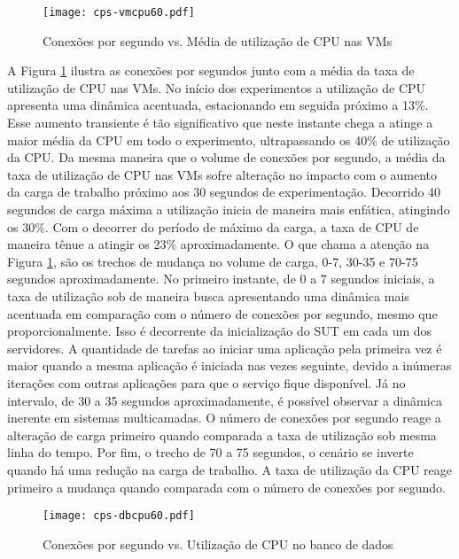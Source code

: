 \begin{figure}[htb]
	\centering
	\texttt{[image: cps-vmcpu60.pdf]}
	\caption{Conexões por segundo vs. Média de utilização de CPU nas VMs}
	\label{fig:cps-vmcpu60}
	\fdadospesquisa
\end{figure}

A Figura \ref{fig:cps-vmcpu60} ilustra as conexões por segundos junto com a média da taxa de utilização de CPU nas VMs. No início dos experimentos a utilização de CPU apresenta uma dinâmica acentuada, estacionando em seguida próximo a 13\%. Esse aumento transiente é tão significativo que neste instante chega a atinge a maior média da CPU em todo o experimento, ultrapassando os 40\% de utilização da CPU. Da mesma maneira que o volume de conexões por segundo, a média da taxa de utilização de CPU nas VMs sofre alteração no impacto com o aumento da carga de trabalho próximo aos 30 segundos de experimentação. Decorrido 40 segundos de carga máxima a utilização inicia de maneira mais enfática, atingindo os 30\%. Com o decorrer do período de máximo da carga, a taxa de CPU de maneira tênue a atingir os 23\% aproximadamente. O que chama a atenção na Figura \ref{fig:cps-vmcpu60}, são os trechos de mudança no volume de carga, 0-7, 30-35 e 70-75 segundos aproximadamente. No primeiro instante, de 0 a 7 segundos iniciais, a taxa de utilização sob de maneira busca apresentando uma dinâmica mais acentuada em comparação com o número de conexões por segundo, mesmo que proporcionalmente. Isso é decorrente da inicialização do SUT em cada um dos servidores. A quantidade de tarefas ao iniciar uma aplicação pela primeira vez é maior quando a mesma aplicação é iniciada nas vezes seguinte, devido a inúmeras iterações com outras aplicações para que o serviço fique disponível. Já no intervalo, de 30 a 35 segundos aproximadamente, é possível observar a dinâmica inerente em sistemas multicamadas. O número de conexões por segundo reage a alteração de carga primeiro quando comparada a taxa de utilização sob mesma linha do tempo. Por fim, o trecho de 70 a 75 segundos, o cenário se inverte quando há uma redução na carga de trabalho. A taxa de utilização da CPU reage primeiro a mudança quando comparada com o número de conexões por segundo.

\begin{figure}[htb]
	\centering
	\texttt{[image: cps-dbcpu60.pdf]}
	\caption{Conexões por segundo vs. Utilização de CPU no banco de dados}
	\label{fig:cps-dbcpu60}
	\fdadospesquisa
\end{figure}

